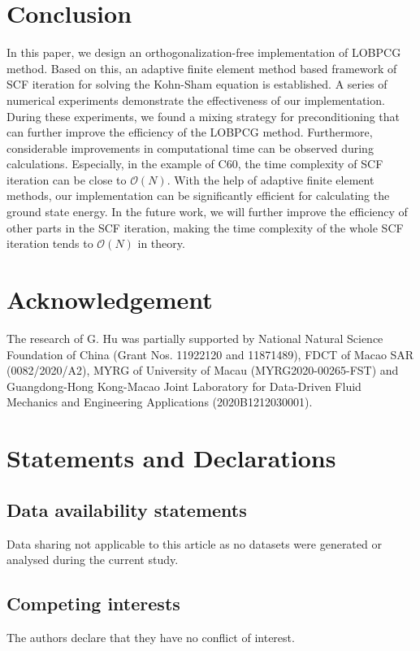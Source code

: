 \documentclass[12pt]{article}
\numberwithin{figure}{section}
\numberwithin{table}{section}
\begin{document}
\section{Conclusion}
In this paper, we design an orthogonalization-free implementation of LOBPCG method. Based on this, an adaptive finite element method based framework of SCF iteration for solving the Kohn-Sham equation is established. A series of numerical experiments demonstrate the effectiveness of our implementation. During these experiments, we found a mixing strategy for preconditioning that can further improve the efficiency of the LOBPCG method. Furthermore, considerable improvements in computational time can be observed during calculations. Especially, in the example of C60, the time complexity of SCF iteration can be close to $\mathcal{O}(N)$. With the help of adaptive finite element methods, our implementation can be significantly efficient for calculating the ground state energy. In the future work, we will further improve the efficiency of other parts in the SCF iteration, making the time complexity of the whole SCF iteration tends to $\mathcal{O}(N)$ in theory. 

\section*{Acknowledgement}
The research of G. Hu was partially supported by National Natural Science
Foundation of China (Grant Nos. 11922120 and 11871489), FDCT of Macao SAR
(0082/2020/A2), MYRG of University of Macau (MYRG2020-00265-FST) and
Guangdong-Hong Kong-Macao Joint Laboratory for Data-Driven Fluid Mechanics and
Engineering Applications (2020B1212030001).

\section*{Statements and Declarations}
\subsection*{Data availability statements}
Data sharing not applicable to this article as no datasets were generated or 
analysed during the current study.

\subsection*{Competing interests}
The authors declare that they have no conflict of interest.



\end{document}
